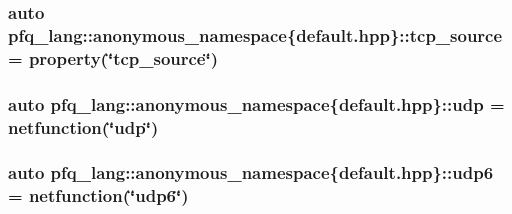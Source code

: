 \hypertarget{namespacepfq__lang_1_1anonymous__namespace_02default_8hpp_03_a4b3ea94407fb5f52e5dfd9e2511f04a8}{
\subsubsection[{tcp\+\_\+source}]{\setlength{\rightskip}{0pt plus 5cm}auto pfq\+\_\+lang\+::anonymous\+\_\+namespace\{default.\+hpp\}\+::tcp\+\_\+source = {\bf property}(\char`\"{}tcp\+\_\+source\char`\"{})}}\label{namespacepfq__lang_1_1anonymous__namespace_02default_8hpp_03_a4b3ea94407fb5f52e5dfd9e2511f04a8}
\hypertarget{namespacepfq__lang_1_1anonymous__namespace_02default_8hpp_03_a1f18de2040dd9d74a07b1c535911abdf}{
\subsubsection[{udp}]{\setlength{\rightskip}{0pt plus 5cm}auto pfq\+\_\+lang\+::anonymous\+\_\+namespace\{default.\+hpp\}\+::udp = {\bf netfunction}(\char`\"{}udp\char`\"{})}}\label{namespacepfq__lang_1_1anonymous__namespace_02default_8hpp_03_a1f18de2040dd9d74a07b1c535911abdf}
\hypertarget{namespacepfq__lang_1_1anonymous__namespace_02default_8hpp_03_a84b7a888d00d5dfea606f7df96ba0ad3}{
\subsubsection[{udp6}]{\setlength{\rightskip}{0pt plus 5cm}auto pfq\+\_\+lang\+::anonymous\+\_\+namespace\{default.\+hpp\}\+::udp6 = {\bf netfunction}(\char`\"{}udp6\char`\"{})}}\label{namespacepfq__lang_1_1anonymous__namespace_02default_8hpp_03_a84b7a888d00d5dfea606f7df96ba0ad3}
